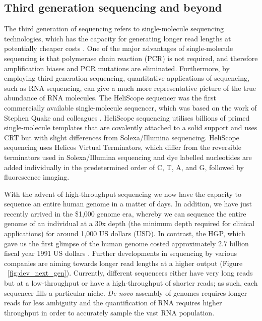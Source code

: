 \subsection{Third generation sequencing and beyond}

The third generation of sequencing refers to single-molecule sequencing technologies, which has the capacity for generating longer read lengths at potentially cheaper costs \citep{pmid20858600}. One of the major advantages of single-molecule sequencing is that polymerase chain reaction (PCR) is not required, and therefore amplification biases and PCR mutations are eliminated. Furthermore, by employing third generation sequencing, quantitative applications of sequencing, such as RNA sequencing, can give a much more representative picture of the true abundance of RNA molecules. The HeliScope sequencer was the first commercially available single-molecule sequencer, which was based on the work of Stephen Quake and colleagues \citep{pmid12651960}. HeliScope sequencing utilises billions of primed single-molecule templates that are covalently attached to a solid support and uses CRT but with slight differences from Solexa/Illumina sequencing. HeliScope sequencing uses Helicos Virtual Terminators, which differ from the reversible terminators used in Solexa/Illumina sequencing and dye labelled nucleotides are added individually in the predetermined order of C, T, A, and G, followed by fluorescence imaging.

With the advent of high-throughput sequencing we now have the capacity to sequence an entire human genome in a matter of days. In addition, we have just recently arrived in the \$1,000 genome era, whereby we can sequence the entire genome of an individual at a 30x depth (the minimum depth required for clinical applications) for around 1,000 US dollars (USD). In contrast, the HGP, which gave us the first glimpse of the human genome \citep{lander2001initial} costed approximately 2.7 billion fiscal year 1991 US dollars \citep{nhgri2010cost}. Further developments in sequencing by various companies are aiming towards longer read lengths at a higher output (Figure ~\ref{fig:dev_next_gen}). Currently, different sequencers either have very long reads but at a low-throughput or have a high-throughput of shorter reads; as such, each sequencer fills a particular niche. \textit{De novo} assembly of genomes requires longer reads for less ambiguity and the quantification of RNA requires higher throughput in order to accurately sample the vast RNA population.

